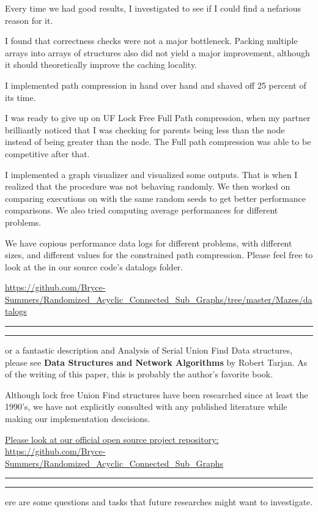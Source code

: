 \documentclass[11pt]{article}
\newcommand{\question}[2] {\vspace{.25in} \hrule\vspace{0.5em}
\noindent{\bf #1: #2} \vspace{0.5em}
\hrule \vspace{.10in}}
\begin{document}
Every time we had good results, I investigated to see if I could find a nefarious reason for it.

I found that correctness checks were not a major bottleneck. Packing multiple arrays into arrays of structures also did not yield a major improvement, although it should theoretically improve the caching locality.

I implemented path compression in hand over hand and shaved off 25 percent of its time.

I was ready to give up on UF Lock Free Full Path compression, when my partner brilliantly noticed that I was checking for parents being less than the node instead of being greater than the node. The Full path compression was able to be competitive after that.

I implemented a graph visualizer and visualized some outputs. That is when I realized that the procedure was not behaving randomly. We then worked on comparing executions on with the same random seeds to get better performance comparisons. We also tried computing average performances for different problems.

We have copious performance data logs for different problems, with different sizes, and different values for the constrained path compression. Please feel free to look at the in our source code's datalogs folder.

\url{https://github.com/Bryce-Summers/Randomized_Acyclic_Connected_Sub_Graphs/tree/master/Mazes/datalogs} 


\newpage

\question{References}

For a fantastic description and Analysis of Serial Union Find Data structures, please see \textbf{Data Structures and Network Algorithms} by Robert Tarjan. As of the writing of this paper, this is probably the author's favorite book.


Although lock free Union Find structures have been researched since at least the 1990's, we have not explicitly consulted with any  published literature while making our implementation descisions.

\href{https://github.com/Bryce-Summers/Randomized_Acyclic_Connected_Sub_Graphs}{Please look at our official open source project repository:}\\
\url{https://github.com/Bryce-Summers/Randomized_Acyclic_Connected_Sub_Graphs} 


\question{Potential Future Work}

Here are some questions and tasks that future researches might want to investigate.
\end{document}
